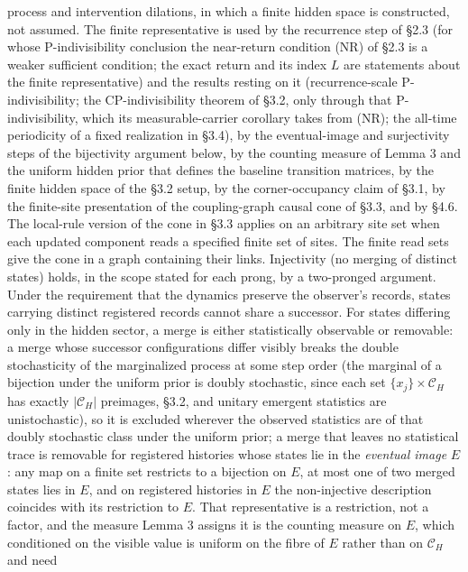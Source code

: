 \documentclass[
]{article}
\begin{document}
process and intervention dilations, in which a finite hidden space is
constructed, not assumed. The finite representative is used by the
recurrence step of §2.3 (for whose P-indivisibility conclusion the
near-return condition (NR) of §2.3 is a weaker sufficient condition; the
exact return and its index \(L\) are statements about the finite
representative) and the results resting on it (recurrence-scale
P-indivisibility; the CP-indivisibility theorem of §3.2, only through
that P-indivisibility, which its measurable-carrier corollary takes from
(NR); the all-time periodicity of a fixed realization in §3.4), by the
eventual-image and surjectivity steps of the bijectivity argument below,
by the counting measure of Lemma 3 and the uniform hidden prior that
defines the baseline transition matrices, by the finite hidden space of
the §3.2 setup, by the corner-occupancy claim of §3.1, by the
finite-site presentation of the coupling-graph causal cone of §3.3, and
by §4.6. The local-rule version of the cone in §3.3 applies on an
arbitrary site set when each updated component reads a specified finite
set of sites. The finite read sets give the cone in a graph containing
their links. Injectivity (no merging of distinct states) holds, in the
scope stated for each prong, by a two-pronged argument. Under the
requirement that the dynamics preserve the observer's records, states
carrying distinct registered records cannot share a successor. For
states differing only in the hidden sector, a merge is either
statistically observable or removable: a merge whose successor
configurations differ visibly breaks the double stochasticity of the
marginalized process at some step order (the marginal of a bijection
under the uniform prior is doubly stochastic, since each set
\(\{x_j\} \times \mathcal{C}_H\) has exactly \(|\mathcal{C}_H|\)
preimages, §3.2, and unitary emergent statistics are unistochastic), so
it is excluded wherever the observed statistics are of that doubly
stochastic class under the uniform prior; a merge that leaves no
statistical trace is removable for registered histories whose states lie
in the \emph{eventual image} \(E\): any map on a finite set restricts to
a bijection on \(E\), at most one of two merged states lies in \(E\),
and on registered histories in \(E\) the non-injective description
coincides with its restriction to \(E\). That representative is a
restriction, not a factor, and the measure Lemma 3 assigns it is the
counting measure on \(E\), which conditioned on the visible value is
uniform on the fibre of \(E\) rather than on \(\mathcal{C}_H\) and need
\end{document}
